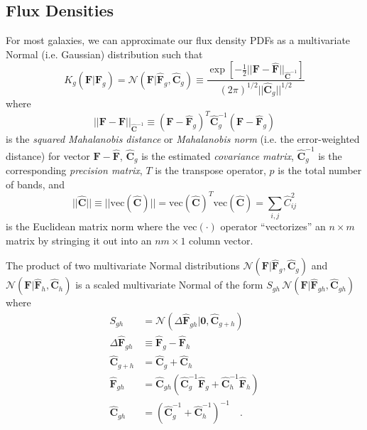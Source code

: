 \documentclass[a4paper,fleqn,usenatbib,english]{mnras}
\begin{document}
\subsection{Flux Densities}
\label{subsec:like_flux}

For most galaxies, we can approximate our flux density PDFs as a multivariate Normal (i.e. Gaussian) distribution such that
\begin{equation}
K_g(\mathbf{F}|\mathbf{\hat{F}}_g) = \mathcal{N}(\mathbf{F}|\mathbf{\hat{F}}_g,\mathbf{\hat{C}}_g) \equiv \frac{\exp\left[-\frac{1}{2}||\mathbf{F}-\mathbf{\hat{F}}||_{\mathbf{\hat{C}}^{-1}}\right]}{(2\pi)^{1/2}||\mathbf{\hat{C}}_g||^{1/2}} \label{eq:mv_gauss}
\end{equation}
where
\begin{equation}
||\mathbf{F}-\mathbf{\hat{F}}||_{\mathbf{\hat{C}}^{-1}} \equiv (\mathbf{F}-\mathbf{\hat{F}}_g)^T\mathbf{\hat{C}}_g^{-1}(\mathbf{F}-\mathbf{\hat{F}}_g)
\end{equation}
is the \textit{squared Mahalanobis distance} or \textit{Mahalanobis norm} (i.e. the error-weighted distance) for vector $\mathbf{F}-\mathbf{\hat{F}}$, $\mathbf{\hat{C}}_g$ is the estimated \textit{covariance matrix}, $\mathbf{\hat{C}}_g^{-1}$ is the corresponding \textit{precision matrix}, $T$ is the transpose operator, $p$ is the total number of bands, and
\begin{equation}
||\mathbf{\hat{C}}|| \equiv ||\mathrm{vec}\left(\mathbf{\hat{C}}\right)|| = \mathrm{vec}\left(\mathbf{\hat{C}}\right)^T \mathrm{vec}\left(\mathbf{\hat{C}}\right) = \sum_{i,j} \hat{C}_{ij}^2
\end{equation}
is the Euclidean matrix norm where the $\mathrm{vec}(\cdot)$ operator ``vectorizes'' an $n \times m$ matrix by stringing it out into an $nm \times 1$ column vector.

The product of two multivariate Normal distributions $\mathcal{N}(\mathbf{F}|\mathbf{\hat{F}}_g,\mathbf{\hat{C}}_g)$ and $\mathcal{N}(\mathbf{F}|\mathbf{\hat{F}}_h,\mathbf{\hat{C}}_h)$ is a scaled multivariate Normal of the form $S_{gh}\,\mathcal{N}(\mathbf{F}|\mathbf{\hat{F}}_{gh},\mathbf{\hat{C}}_{gh})$ where
\begin{align}
S_{gh}&= \mathcal{N}(\Delta\mathbf{\hat{F}}_{gh}|\mathbf{0},\mathbf{\hat{C}}_{g+h}) \label{eq:mvg_S} \\ 
\Delta\mathbf{\hat{F}}_{gh} &\equiv \mathbf{\hat{F}}_{g}-\mathbf{\hat{F}}_{h} \\
\mathbf{\hat{C}}_{g+h}&= \mathbf{\hat{C}}_g+\mathbf{\hat{C}}_h \label{eq:mvg_C} \\
\mathbf{\hat{F}}_{gh}&= \mathbf{\hat{C}}_{gh} \left( \mathbf{\hat{C}}_g^{-1}\mathbf{\hat{F}}_g + \mathbf{\hat{C}}_h^{-1}\mathbf{\hat{F}}_h \right) \label{eq:mvg_mu} \\
\mathbf{\hat{C}}_{gh}&= \left(\mathbf{\hat{C}}_g^{-1}+\mathbf{\hat{C}}_h^{-1}\right)^{-1} \quad . \label{eq:mvg_C}
\end{align}
\end{document}
